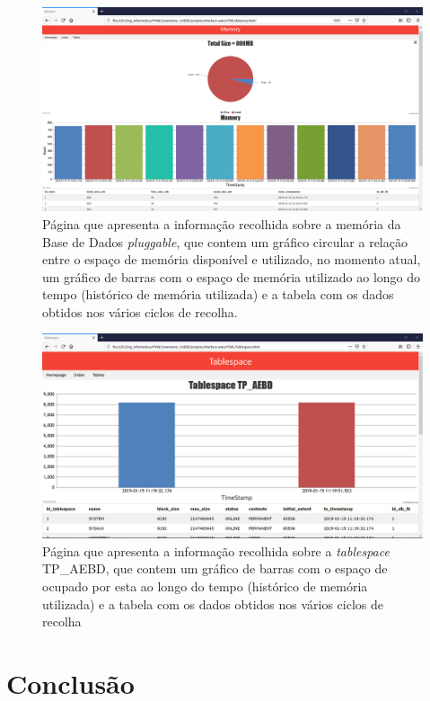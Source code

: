 \documentclass[a4paper]{article}
\begin{document}
\begin{figure}[H]
\centering
\includegraphics[scale=0.4]{html/mem.png}
\caption{Página que apresenta a informação recolhida sobre a memória da Base de Dados \emph{pluggable}, que contem um gráfico circular a relação entre o espaço de memória disponível e utilizado, no momento atual, um gráfico de barras com o espaço de memória utilizado ao longo do tempo (histórico de memória utilizada) e a tabela com os dados obtidos nos vários ciclos de recolha.}
\end{figure}

\begin{figure}[H]
\centering
\includegraphics[scale=0.4]{html/tablespace.png}
\caption{Página que apresenta a informação recolhida sobre a \emph{tablespace} TP\_AEBD, que contem um gráfico de barras com o espaço de ocupado por esta ao longo do tempo (histórico de memória utilizada) e a tabela com os dados obtidos nos vários ciclos de recolha}
\end{figure}

\newpage
\section{Conclusão}
\hspace{3mm} 
\end{document}
